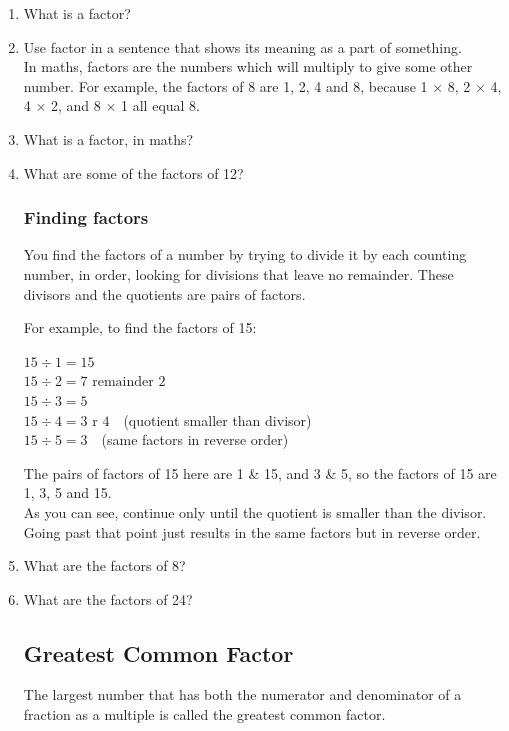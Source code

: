 \documentclass[14pt]{article}
\begin{document}
\begin{enumerate}
\item What is a factor?
\item Use factor in a sentence that shows its meaning as a part of something.\\

In maths, factors are the numbers which will multiply to give some other number. For example, the factors of 8 are 1, 2, 4 and 8, because 1 $\times$ 8, 2 $\times$ 4, 4 $\times$ 2, and 8 $\times$ 1 all equal 8.

\item What is a factor, in maths?
\item What are some of the factors of 12?

\subsubsection*{Finding factors}
You find the factors of a number by trying to divide it by each counting number, in order, looking for divisions that leave no remainder. These divisors and the quotients are pairs of factors.

For example, to find the factors of 15:

\begin{doublespacing}
$15 \div 1 = 15$\ \ \longleftarrow\\
$15 \div 2 = 7 \textrm{ remainder }2$\\
$15 \div 3 = 5$\ \ \longleftarrow\\
$15 \div 4 = 3 \textrm{ r }4$\ \ (quotient smaller than divisor)\\
$15 \div 5 = 3$\ \ (same factors in reverse order)\\
\end{doublespacing}

The pairs of factors of 15 here are 1 \&  15, and 3 \& 5, so the factors of 15 are 1, 3, 5 and 15.\\

As you can see, continue only until the quotient is smaller than the divisor. Going past that point just results in the same factors but in reverse order.

\item What are the factors of 8?
\item What are the factors of 24?

\newpage

\subsection*{Greatest Common Factor}
The largest number that has both the numerator and denominator of a fraction as a multiple is called the greatest common factor.\\


\end{enumerate}
\end{document}
